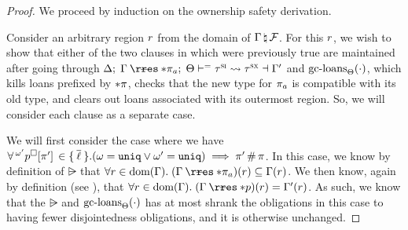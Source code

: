 \begin{proof}
  We proceed by induction on the ownership safety derivation.

  \vspace{1em}
  \noindent \framebox[\textwidth]{ \figuresize
    \begin{mathpar}
      \OSafePlace
    \end{mathpar}
  } \vspace{1em}

  Consider an arbitrary region $r$ from the domain of
  $\Gamma \, \natural \, \mathcal{F}$. For this $r$, we wish to show that
  either of the two clauses in  which were previously true
  are maintained after going through
  $\oxtunify[\oxnoop]{\oxtvarctx}{\oxkontctx}{
    \oxrsub{\oxvarctx}{\oxderef{\oxplace_a}}
  }{\oxsitype}{\oxsxtype}{\oxvarctx^\prime}$ and $\textrm{gc-loans}_{\Theta}(\cdot)$,
  which kills loans prefixed by $* \pi$, checks that the new type
  for $\pi_a$ is compatible with its old type, and clears out loans
  associated with its outermost region. So, we will consider each clause as a
  separate case.

  We will first consider the case where we have $\forall
  \,^{\omega^\prime}p^\square[\pi^\prime]\, \in \{ \: \overline{\ell} \: \}.
  (\omega = \mathtt{uniq} \vee \omega^\prime = \mathtt{uniq}) \implies
  \pi^\prime \, \# \, \pi$. In this case, we know by definition of
  $\rsub$ that $\forall \oxcprov \in \oxdomain{\oxvarctx}. \;
  (\oxrsub{\oxvarctx}{\oxderef{\oxplace_a}})(\oxcprov) \subseteq \oxvarctx(\oxcprov)$.
  We then know, again by definition (see ), that
  $\forall \oxcprov \in \oxdomain{\oxvarctx}. \;
  (\oxrsub{\oxvarctx}{\oxderef{\oxplaceexpr}})(\oxcprov) =
  \oxvarctx^\prime(\oxcprov)$. As such, we know that the $\rsub$ and
  $\textrm{gc-loans}_{\Theta}(\cdot)$ has at most shrank the obligations in this case to
  having fewer disjointedness obligations, and it is otherwise unchanged.


\end{proof}
